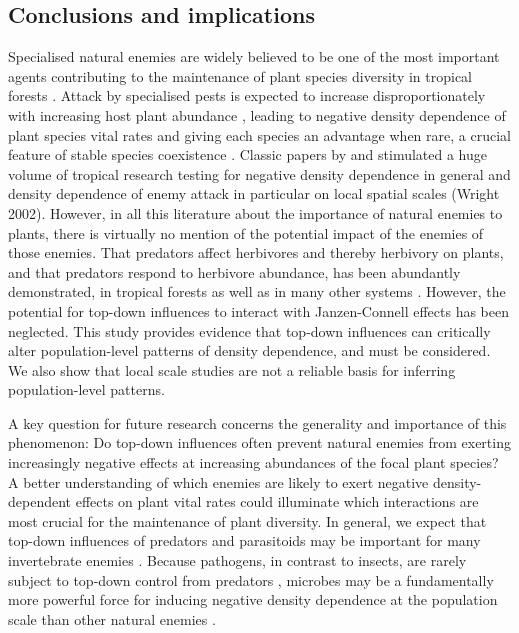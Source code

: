 \documentclass[b5paper,justified]{tufte-book} %
\begin{document}
\begin{fullwidth}
\subsection{Conclusions and implications}
Specialised natural enemies are widely believed to be one of the most important agents contributing to the maintenance of plant species diversity in tropical forests \citep{Wright2002, Leigh2004}. Attack by specialised pests is expected to increase disproportionately with increasing host plant abundance \citep{Gillett1962, Janzen1970, Connell1971, Hammond1998, Leigh2004, Lewis2008}, leading to negative density dependence of plant species vital rates and giving each species an advantage when rare, a crucial feature of stable species coexistence \citep{Chesson2000}. Classic papers by \citet{Janzen1970} and \citet{Connell1971} stimulated a huge volume of tropical research testing for negative density dependence in general and density dependence of enemy attack in particular on local spatial
scales (Wright 2002). However, in all this literature about the importance of natural enemies to plants, there is virtually no mention of the potential impact of the enemies of those enemies. That predators affect herbivores and thereby herbivory on plants, and that predators respond to herbivore abundance, has been abundantly demonstrated, in tropical forests as well as in many other systems \citep{Terborgh2010}. However, the potential for top-down
influences to interact with Janzen-Connell effects has been neglected. This study provides evidence that top-down influences can critically alter population-level patterns of density dependence, and must be considered. We also show that local scale studies are not a reliable basis for inferring population-level patterns.

A key question for future research concerns the generality and importance of this phenomenon: Do top-down influences often prevent natural enemies from exerting increasingly negative effects at increasing abundances of the focal plant species? A better understanding of which enemies are likely to exert negative density-dependent effects on plant vital rates could illuminate which interactions are most crucial for the maintenance of plant diversity. In general, we expect that top-down influences of predators and parasitoids may be important for many invertebrate enemies \citep{VanBael2005, Kalka2008}. Because pathogens, in contrast to insects, are rarely subject to top-down control from predators \citep{Agrios2005}, microbes may be a fundamentally more powerful force for inducing negative density dependence at the population scale than other natural enemies \citep{Mangan2010}. 

\end{fullwidth}
\end{document}
